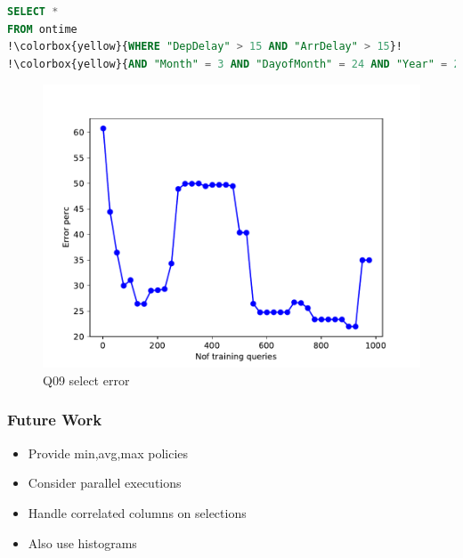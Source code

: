 \begin{frame}[fragile]
\begin{lstlisting}[basicstyle=\ttfamily\footnotesize, language=SQL, escapechar=!]
SELECT *
FROM ontime
!\colorbox{yellow}{WHERE "DepDelay" > 15 AND "ArrDelay" > 15}!
!\colorbox{yellow}{AND "Month" = 3 AND "DayofMonth" = 24 AND "Year" = 2013}!
\end{lstlisting}
	\begin{figure}[!htb]
	    \includegraphics[scale=0.45]{../figs/airtraffic/airtraffic_sel09_error.pdf}
	    \caption{Q09 select error}
	\end{figure}
\end{frame}


\begin{frame}[fragile]
\frametitle{Future Work}
\begin{block}{}
\begin{itemize}
\item Provide min,avg,max policies
\item Consider parallel executions
\item Handle correlated columns on selections
\item Also use histograms
\end{itemize}
\end{block}
\end{frame}
